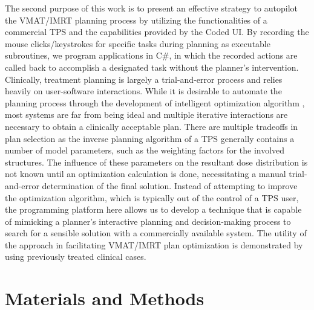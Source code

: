 The second purpose of this work is to present an effective strategy to autopilot the VMAT/IMRT planning process by utilizing the functionalities of a commercial TPS and the capabilities provided by the Coded UI. By recording the mouse clicks/keystrokes for specific tasks during planning as executable subroutines, we program applications in C\#, in which the recorded actions are called back to accomplish a designated task without the planner's intervention. Clinically, treatment planning is largely a trial-and-error process and relies heavily on user-software interactions. While it is desirable to automate the planning process through the development of intelligent optimization algorithm \cite{xing1999a, xing1999b, lee2013, xhaferllari2013, yang2004, cotrutz2001, yu2000, breedveld2012, tol2015}, most systems are far from being ideal and multiple iterative interactions are necessary to obtain a clinically acceptable plan.  There are multiple tradeoffs in plan selection as the inverse planning algorithm of a TPS generally contains a number of model parameters, such as the weighting factors for the involved structures. The influence of these parameters on the resultant dose distribution is not known until an optimization calculation is done, necessitating a manual trial-and-error determination of the final solution.  Instead of attempting to improve the optimization algorithm, which is typically out of the control of a TPS user, the programming platform here allows us to develop a technique that is capable of mimicking a planner's interactive planning and decision-making process to search for a sensible solution with a commercially available system. The utility of the approach in facilitating VMAT/IMRT plan optimization is demonstrated by using previously treated clinical cases.  
        
\section{Materials and Methods}
